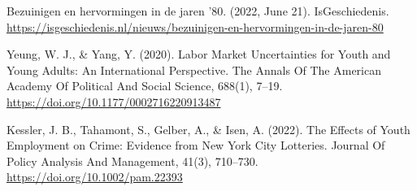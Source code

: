 \documentclass[
]{article}
\begin{document}
Bezuinigen en hervormingen in de jaren '80. (2022, June 21).
IsGeschiedenis.
\url{https://isgeschiedenis.nl/nieuws/bezuinigen-en-hervormingen-in-de-jaren-80}

Yeung, W. J., \& Yang, Y. (2020). Labor Market Uncertainties for Youth
and Young Adults: An International Perspective. The Annals Of The
American Academy Of Political And Social Science, 688(1), 7--19.
\url{https://doi.org/10.1177/0002716220913487}

Kessler, J. B., Tahamont, S., Gelber, A., \& Isen, A. (2022). The
Effects of Youth Employment on Crime: Evidence from New York City
Lotteries. Journal Of Policy Analysis And Management, 41(3), 710--730.
\url{https://doi.org/10.1002/pam.22393}
\end{document}
